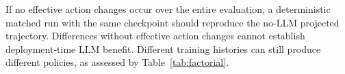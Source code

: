 \documentclass[10pt]{article}
\begin{document}
If no effective action changes occur over the entire evaluation, a deterministic
matched run with the same checkpoint should reproduce the no-LLM projected
trajectory. Differences without effective action changes cannot establish deployment-time
LLM benefit. Different training histories can still produce different policies,
as assessed by Table~\ref{tab:factorial}.
\end{document}
